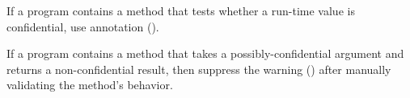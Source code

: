 If a program contains a method that tests whether a run-time value is
confidential, use annotation
 ().

If a program contains a method that takes a possibly-confidential argument
and returns a non-confidential result, then suppress the warning
() after manually validating the
method's behavior.
